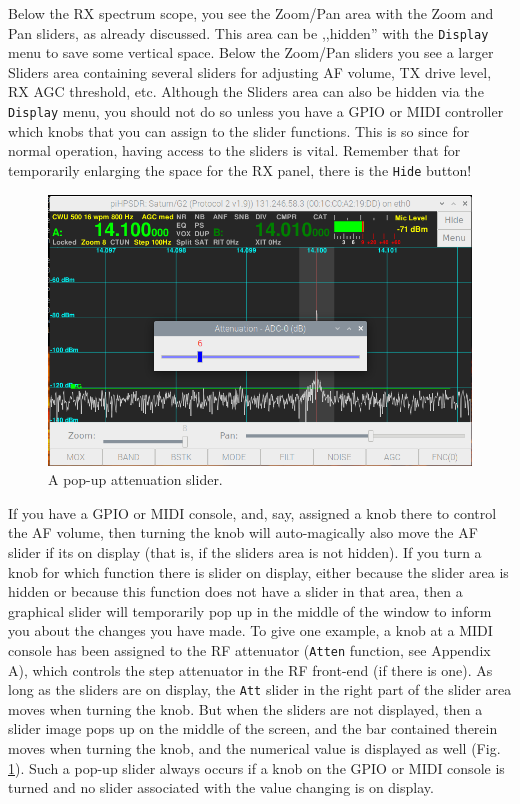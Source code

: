 \documentclass[12pt]{book}
\def\rett#1{\texttt{\color{red}#1}}
\def\bltt#1{\texttt{\color{blue}#1}}
\begin{document}
Below the RX  spectrum scope, you see the Zoom/Pan area with
the  Zoom and Pan sliders, as already discussed. This area
can be ,,hidden'' with the \bltt{Display} menu to save some
vertical space. Below the
Zoom/Pan sliders you see a larger  Sliders area containing
several sliders for adjusting AF volume, TX  drive level,
RX  AGC threshold, etc. Although the Sliders area can also
be hidden via the \bltt{Display} menu, you should not do so
unless you have a GPIO or MIDI controller which knobs that
you can assign to the slider functions. This is so since
for  normal operation, having access to the sliders is vital.
Remember that for temporarily enlarging the space for
the RX  panel, there is the \rett{Hide} button!

\begin{figure}
\center
\includegraphics[width=12cm]{SliderOnScreen.png}
\caption{A pop-up attenuation slider.}
\label{fig:SliderOnScreen}
\end{figure}

If you have a GPIO or  MIDI  console, and, say, assigned
a knob there to control the AF volume, then turning the
knob will auto-magically also move the AF slider if its
on display (that is, if the sliders area is not hidden).
If you turn a knob for which function there is slider
on display, either because the slider area is hidden or
because this function does not have a slider in that area,
then a graphical slider will temporarily pop up in the
middle of the window to inform you about the changes
you have  made. To give one example, a knob at a
MIDI console has been assigned to the RF attenuator (\bltt{Atten}
function, see Appendix A), which controls the step
attenuator in the RF front-end (if there is one). As long
as the  sliders  are  on display, the \rett{Att} slider
in the right part of the slider area moves when turning
the knob. But when the sliders are not displayed, then a slider image
pops up  on the middle of the screen, and the
bar contained therein moves when turning the knob,
and the numerical value is displayed as well (Fig. \ref{fig:SliderOnScreen}).
Such a pop-up slider always occurs if a knob on the GPIO or MIDI
console is turned and no slider associated with the value changing is
on display.
\end{document}
